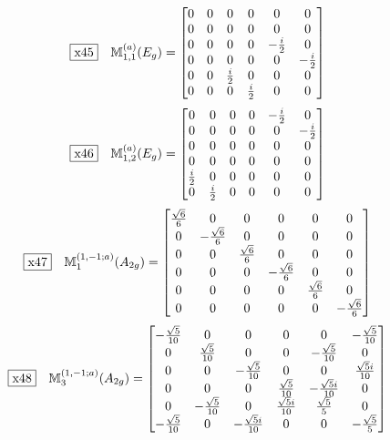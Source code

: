 \documentclass[fleqn,10pt,landscape]{jsarticle}
\begin{document}
\begin{dmath*}
\fbox{x45}\quad \mathbb{M}_{1,1}^{(a)}(E_{g})=\begin{bmatrix} 0 & 0 & 0 & 0 & 0 & 0 \\ 0 & 0 & 0 & 0 & 0 & 0 \\ 0 & 0 & 0 & 0 & - \frac{i}{2} & 0 \\ 0 & 0 & 0 & 0 & 0 & - \frac{i}{2} \\ 0 & 0 & \frac{i}{2} & 0 & 0 & 0 \\ 0 & 0 & 0 & \frac{i}{2} & 0 & 0 \end{bmatrix}
\end{dmath*}
\begin{dmath*}
\fbox{x46}\quad \mathbb{M}_{1,2}^{(a)}(E_{g})=\begin{bmatrix} 0 & 0 & 0 & 0 & - \frac{i}{2} & 0 \\ 0 & 0 & 0 & 0 & 0 & - \frac{i}{2} \\ 0 & 0 & 0 & 0 & 0 & 0 \\ 0 & 0 & 0 & 0 & 0 & 0 \\ \frac{i}{2} & 0 & 0 & 0 & 0 & 0 \\ 0 & \frac{i}{2} & 0 & 0 & 0 & 0 \end{bmatrix}
\end{dmath*}
\begin{dmath*}
\fbox{x47}\quad \mathbb{M}_{1}^{(1,-1;a)}(A_{2g})=\begin{bmatrix} \frac{\sqrt{6}}{6} & 0 & 0 & 0 & 0 & 0 \\ 0 & - \frac{\sqrt{6}}{6} & 0 & 0 & 0 & 0 \\ 0 & 0 & \frac{\sqrt{6}}{6} & 0 & 0 & 0 \\ 0 & 0 & 0 & - \frac{\sqrt{6}}{6} & 0 & 0 \\ 0 & 0 & 0 & 0 & \frac{\sqrt{6}}{6} & 0 \\ 0 & 0 & 0 & 0 & 0 & - \frac{\sqrt{6}}{6} \end{bmatrix}
\end{dmath*}
\begin{dmath*}
\fbox{x48}\quad \mathbb{M}_{3}^{(1,-1;a)}(A_{2g})=\begin{bmatrix} - \frac{\sqrt{5}}{10} & 0 & 0 & 0 & 0 & - \frac{\sqrt{5}}{10} \\ 0 & \frac{\sqrt{5}}{10} & 0 & 0 & - \frac{\sqrt{5}}{10} & 0 \\ 0 & 0 & - \frac{\sqrt{5}}{10} & 0 & 0 & \frac{\sqrt{5} i}{10} \\ 0 & 0 & 0 & \frac{\sqrt{5}}{10} & - \frac{\sqrt{5} i}{10} & 0 \\ 0 & - \frac{\sqrt{5}}{10} & 0 & \frac{\sqrt{5} i}{10} & \frac{\sqrt{5}}{5} & 0 \\ - \frac{\sqrt{5}}{10} & 0 & - \frac{\sqrt{5} i}{10} & 0 & 0 & - \frac{\sqrt{5}}{5} \end{bmatrix}
\end{dmath*}
\end{document}
